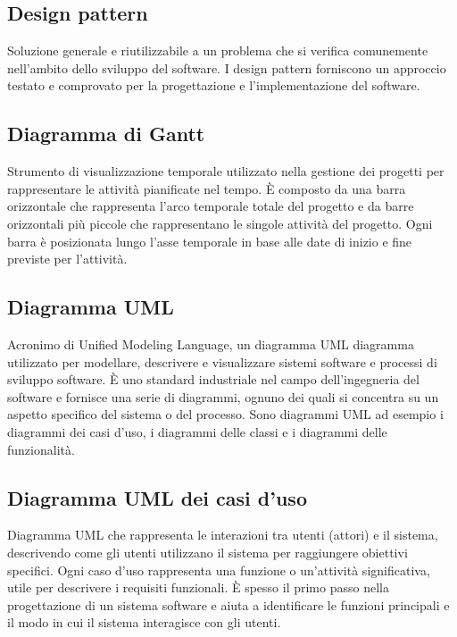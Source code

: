 \hypertarget{sec:design_pattern}{}
\subsection*{Design pattern}
Soluzione generale e riutilizzabile a un problema che si verifica comunemente nell’ambito dello sviluppo del software.
I design pattern forniscono un approccio testato e comprovato per la progettazione e l’implementazione del software.

\hypertarget{sec:diagramma_Gantt}{}
\subsection*{Diagramma di Gantt}
Strumento di visualizzazione temporale utilizzato nella gestione dei progetti per rappresentare le attività pianificate nel tempo. È composto da una barra 
orizzontale che rappresenta l’arco temporale totale del progetto e da barre orizzontali più piccole che rappresentano le singole attività del progetto. 
Ogni barra è posizionata lungo l’asse temporale in base alle date di inizio e fine previste per l’attività.

\hypertarget{sec:diagramma_UML}{}
\subsection*{Diagramma UML}
Acronimo di Unified Modeling Language, un diagramma UML diagramma utilizzato per modellare, descrivere e visualizzare sistemi software e processi di sviluppo 
software. È uno standard industriale nel campo dell’ingegneria del software e fornisce una serie di diagrammi, ognuno dei quali si concentra su un aspetto 
specifico del sistema o del processo. Sono diagrammi UML ad esempio i diagrammi dei casi d’uso, i diagrammi delle classi e i diagrammi delle funzionalità.

\subsection*{Diagramma UML dei casi d'uso}
Diagramma UML che rappresenta le interazioni tra utenti (attori) e il sistema, descrivendo come gli utenti utilizzano il sistema per raggiungere obiettivi 
specifici. Ogni caso d'uso rappresenta una funzione o un'attività significativa, utile per descrivere i requisiti funzionali. È spesso il primo passo nella 
progettazione di un sistema software e aiuta a identificare le funzioni principali e il modo in cui il sistema interagisce con gli utenti.

